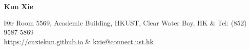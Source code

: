 \documentclass[letterpaper,10pt]{article}
\newcommand{\resheading}[1]{{\large \colorbox{mygrey}{\begin{minipage}{\textwidth}{\textbf{#1 \vphantom{p\^{E}}}}\end{minipage}}}}
\begin{document}


\newcommand{\mywebheader}{
\begin{tabular*}{\linewidth}{{l@{\extracolsep{\fill}}r}}
    {\large Room 5569, Academic Building, HKUST, Clear Water Bay, HK} & {\large Tel: (852) 9587-5869} \\
    {\large \href{https://cnxiekun.github.io}{https://cnxiekun.github.io}} & {\large \href{mailto:kxie@connect.ust.hk}{kxie@connect.ust.hk}}
\end{tabular*}
\\
\vspace{0.15in}}

\begin{center}
    \textbf{{\huge Kun Xie}}
\end{center}

\vspace{0.1in}


\mywebheader
\end{document}
